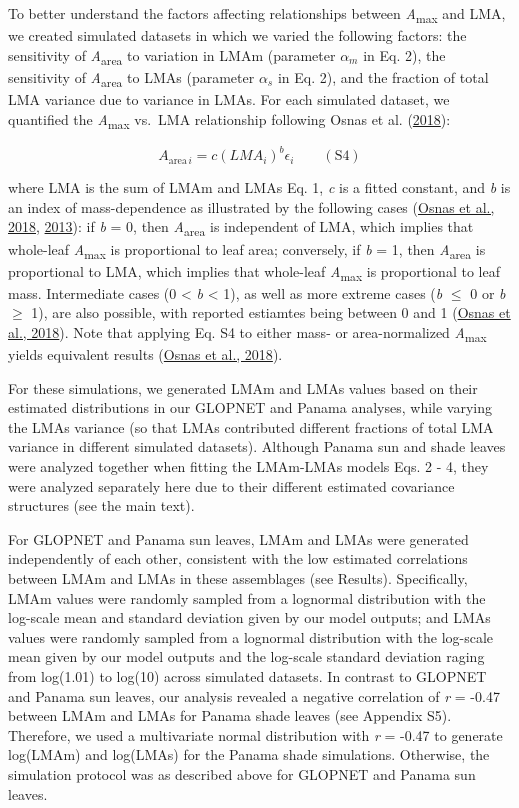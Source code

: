 \documentclass[
  12pt,
  letterpaper,
  DIV=11,
  numbers=noendperiod]{scrartcl}
\begin{document}
To better understand the factors affecting relationships between
\emph{A}\textsubscript{max} and LMA, we created simulated datasets in
which we varied the following factors: the sensitivity of
\emph{A}\textsubscript{area} to variation in LMAm (parameter
\(\alpha_m\) in Eq. 2), the sensitivity of \emph{A}\textsubscript{area}
to LMAs (parameter \(\alpha_s\) in Eq. 2), and the fraction of total LMA
variance due to variance in LMAs. For each simulated dataset, we
quantified the \emph{A}\textsubscript{max} vs.~LMA relationship
following Osnas et al. (\protect\hyperlink{ref-Osnas2018}{2018}):

\[
A_{\mathrm{area} \, i} = c (LMA_i)^{b}\epsilon_i \qquad(\mathrm{S}4)
\]

where LMA is the sum of LMAm and LMAs Eq. 1, \emph{c} is a fitted
constant, and \emph{b} is an index of mass-dependence as illustrated by
the following cases (\protect\hyperlink{ref-Osnas2018}{Osnas et al.,
2018}, \protect\hyperlink{ref-Osnas2013}{2013}): if \emph{b} = 0, then
\emph{A}\textsubscript{area} is independent of LMA, which implies that
whole-leaf \emph{A}\textsubscript{max} is proportional to leaf area;
conversely, if \emph{b} = 1, then \emph{A}\textsubscript{area} is
proportional to LMA, which implies that whole-leaf
\emph{A}\textsubscript{max} is proportional to leaf mass. Intermediate
cases (0 \textless{} \emph{b} \textless{} 1), as well as more extreme
cases (\emph{b} \(\le\) 0 or \emph{b} \(\geq\) 1), are also possible,
with reported estiamtes being between 0 and 1
(\protect\hyperlink{ref-Osnas2018}{Osnas et al., 2018}). Note that
applying Eq. S4 to either mass- or area-normalized
\emph{A}\textsubscript{max} yields equivalent results
(\protect\hyperlink{ref-Osnas2018}{Osnas et al., 2018}).

For these simulations, we generated LMAm and LMAs values based on their
estimated distributions in our GLOPNET and Panama analyses, while
varying the LMAs variance (so that LMAs contributed different fractions
of total LMA variance in different simulated datasets). Although Panama
sun and shade leaves were analyzed together when fitting the LMAm-LMAs
models Eqs. 2 - 4, they were analyzed separately here due to their
different estimated covariance structures (see the main text).

For GLOPNET and Panama sun leaves, LMAm and LMAs were generated
independently of each other, consistent with the low estimated
correlations between LMAm and LMAs in these assemblages (see Results).
Specifically, LMAm values were randomly sampled from a lognormal
distribution with the log-scale mean and standard deviation given by our
model outputs; and LMAs values were randomly sampled from a lognormal
distribution with the log-scale mean given by our model outputs and the
log-scale standard deviation raging from log(1.01) to log(10) across
simulated datasets. In contrast to GLOPNET and Panama sun leaves, our
analysis revealed a negative correlation of \emph{r} = -0.47 between
LMAm and LMAs for Panama shade leaves (see Appendix S5). Therefore, we
used a multivariate normal distribution with \emph{r} = -0.47 to
generate log(LMAm) and log(LMAs) for the Panama shade simulations.
Otherwise, the simulation protocol was as described above for GLOPNET
and Panama sun leaves.
\end{document}
